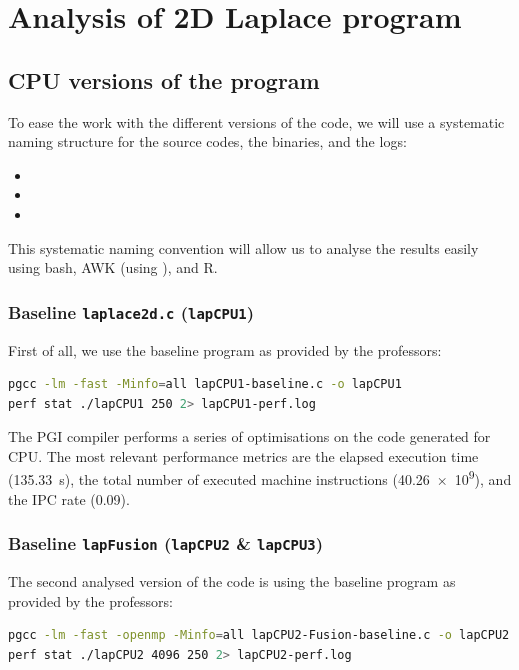 \section{Analysis of 2D Laplace program}\label{sec:results-laplace}

\subsection{CPU versions of the program}
To ease the work with the different versions of the code, we will use a systematic naming structure for the source codes, the binaries, and the logs:
\begin{itemize}
	\item {}
	\item {}
	\item {}
\end{itemize}

This systematic naming convention will allow us to analyse the results easily using bash, AWK (using ), and R.

\subsubsection{Baseline \texttt{laplace2d.c} (\texttt{lapCPU1})}
First of all, we use the baseline  program as provided by the professors:
\begin{lstlisting}[language=bash]
pgcc -lm -fast -Minfo=all lapCPU1-baseline.c -o lapCPU1
perf stat ./lapCPU1 250 2> lapCPU1-perf.log
\end{lstlisting}

The PGI compiler performs a series of optimisations on the code generated for CPU. The most relevant performance metrics are the elapsed execution time (\SI{135.33}{\s}), the total number of executed machine instructions (\num{40.26e9}), and the IPC rate (\num{0.09}).

\subsubsection{Baseline \texttt{lapFusion} (\texttt{lapCPU2} \& \texttt{lapCPU3})}
The second analysed version of the code is using the baseline  program as provided by the professors:
\begin{lstlisting}[language=bash]
pgcc -lm -fast -openmp -Minfo=all lapCPU2-Fusion-baseline.c -o lapCPU2
perf stat ./lapCPU2 4096 250 2> lapCPU2-perf.log
\end{lstlisting}

